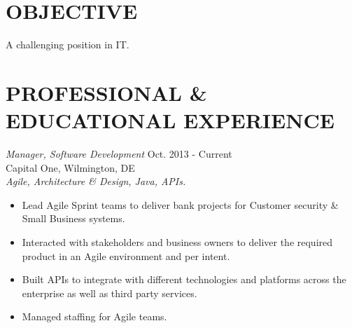 \documentclass[line,margin]{res}
\begin{document}
\address{407.601.9424 - ghaitho@gmail.com}

\begin{resume}
 
\section{OBJECTIVE}
A challenging position in IT.

\section{PROFESSIONAL \& EDUCATIONAL EXPERIENCE}

{\sl Manager, Software Development} \hfill        Oct. 2013 - Current  \\
Capital One, Wilmington, DE \\
  \textit{Agile, Architecture \& Design, Java, APIs.}
  \begin{itemize} \itemsep -2pt %
      \item  Lead Agile Sprint teams to deliver bank projects for Customer 
      security \& Small Business systems.
      \item  Interacted with stakeholders and business owners to deliver the required product 
      in an Agile environment and per intent.
      \item  Built APIs to integrate with different technologies and platforms across the enterprise as well as third party services.
      \item  Managed staffing for Agile teams.
 \end{itemize}


\end{resume}
\end{document}
